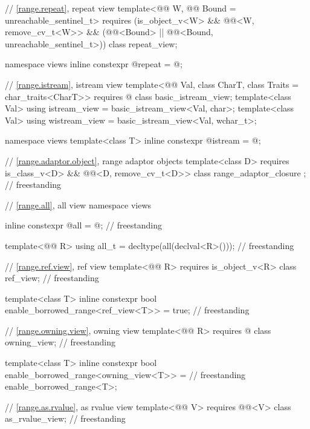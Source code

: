 \begin{codeblock}
{  // \ref{range.repeat}, repeat view
  template<@@ W, @@ Bound = unreachable_sentinel_t>
    requires (is_object_v<W> && @@<W, remove_cv_t<W>>
      && (@@<Bound> || @@<Bound, unreachable_sentinel_t>))
  class repeat_view;

  namespace views { inline constexpr @\unspec@ repeat = @\unspec@; }

  // \ref{range.istream}, istream view
  template<@@ Val, class CharT, class Traits = char_traits<CharT>>
    requires @\seebelow@
  class basic_istream_view;
  template<class Val>
    using istream_view = basic_istream_view<Val, char>;
  template<class Val>
    using wistream_view = basic_istream_view<Val, wchar_t>;

  namespace views { template<class T> inline constexpr @\unspecnc@ istream = @\unspecnc@; }

  // \ref{range.adaptor.object}, range adaptor objects
  template<class D>
    requires is_class_v<D> && @@<D, remove_cv_t<D>>
  class range_adaptor_closure { };                                                  // freestanding

  // \ref{range.all}, all view
  namespace views {
    inline constexpr @\unspecnc@ all = @\unspecnc@;                                 // freestanding

    template<@@ R>
      using all_t = decltype(all(declval<R>()));                                    // freestanding
  }

  // \ref{range.ref.view}, ref view
  template<@@ R>
    requires is_object_v<R>
  class ref_view;                                                                   // freestanding

  template<class T>
    inline constexpr bool enable_borrowed_range<ref_view<T>> = true;                // freestanding

  // \ref{range.owning.view}, owning view
  template<@@ R>
    requires @\seebelow@
  class owning_view;                                                                // freestanding

  template<class T>
    inline constexpr bool enable_borrowed_range<owning_view<T>> =                   // freestanding
      enable_borrowed_range<T>;

  // \ref{range.as.rvalue}, as rvalue view
  template<@@ V>
    requires @@<V>
  class as_rvalue_view;                                                             // freestanding

}
\end{codeblock}
